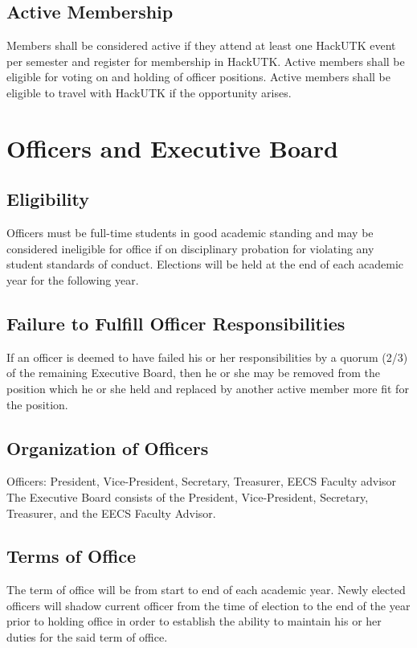 \documentclass[12pt]{article}
\begin{document}
\subsection{Active Membership}
Members shall be considered active if they attend at least one HackUTK event per semester and register for membership in HackUTK. Active members shall be eligible for voting on and holding of officer positions. Active members shall be eligible to travel with HackUTK if the opportunity arises. 

\section*{Officers and Executive Board}
\subsection{Eligibility}
Officers must be full-time students in good academic standing and may be considered ineligible for office if on disciplinary probation for violating any student standards of conduct. Elections will be held at the end of each academic year for the following year.

\subsection{Failure to Fulfill Officer Responsibilities}
If an officer is deemed to have failed his or her responsibilities by a quorum (2/3) of the remaining Executive Board, then he or she may be removed from the position which he or she held and replaced by another active member more fit for the position.

\subsection{Organization of Officers}
Officers: President, Vice-President, Secretary, Treasurer, EECS Faculty advisor
The Executive Board consists of the President, Vice-President, Secretary, Treasurer, and the EECS Faculty Advisor.

\subsection{Terms of Office}
The term of office will be from start to end of each academic year. Newly elected officers will shadow current officer from the time of election to the end of the year prior to holding office in order to establish the ability to maintain his or her duties for the said term of office.
\end{document}
